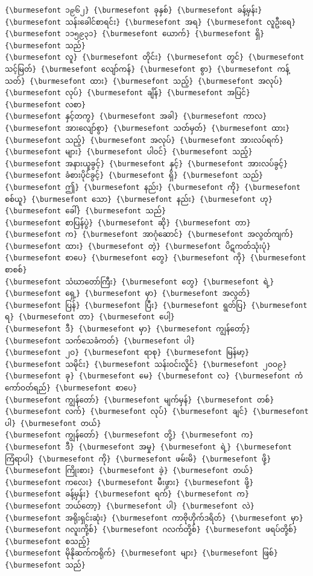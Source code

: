 \documentclass[11pt]{article}
\begin{document}
    \begin{Verbatim}[commandchars=\\\{\}]
{\burmesefont ၁၉၆၂} {\burmesefont ခုနှစ်} {\burmesefont ခန့်မှန်း} {\burmesefont သန်းခေါင်စာရင်း} {\burmesefont အရ} {\burmesefont လူဦးရေ} {\burmesefont ၁၁၅၉၃၁} {\burmesefont ယောက်} {\burmesefont ရှိ} {\burmesefont သည်}
{\burmesefont လူ} {\burmesefont တိုင်း} {\burmesefont တွင်} {\burmesefont သင့်မြတ်} {\burmesefont လျော်ကန်} {\burmesefont စွာ} {\burmesefont ကန့်သတ်} {\burmesefont ထား} {\burmesefont သည့်} {\burmesefont အလုပ်} {\burmesefont လုပ်} {\burmesefont ချိန်} {\burmesefont အပြင်} {\burmesefont လစာ}
{\burmesefont နှင့်တကွ} {\burmesefont အခါ} {\burmesefont ကာလ} {\burmesefont အားလျော်စွာ} {\burmesefont သတ်မှတ်} {\burmesefont ထား} {\burmesefont သည့်} {\burmesefont အလုပ်} {\burmesefont အားလပ်ရက်} {\burmesefont များ} {\burmesefont ပါဝင်} {\burmesefont သည့်}
{\burmesefont အနားယူခွင့်} {\burmesefont နှင့်} {\burmesefont အားလပ်ခွင့်} {\burmesefont ခံစားပိုင်ခွင့်} {\burmesefont ရှိ} {\burmesefont သည်}
{\burmesefont ဤ} {\burmesefont နည်း} {\burmesefont ကို} {\burmesefont စစ်ယူ} {\burmesefont သော} {\burmesefont နည်း} {\burmesefont ဟု} {\burmesefont ခေါ်} {\burmesefont သည်}
{\burmesefont စာပြန်ပွဲ} {\burmesefont ဆို} {\burmesefont တာ} {\burmesefont က} {\burmesefont အာဂုံဆောင်} {\burmesefont အလွတ်ကျက်} {\burmesefont ထား} {\burmesefont တဲ့} {\burmesefont ပိဋကတ်သုံးပုံ} {\burmesefont စာပေ} {\burmesefont တွေ} {\burmesefont ကို} {\burmesefont စာစစ်}
{\burmesefont သံဃာတော်ကြီး} {\burmesefont တွေ} {\burmesefont ရဲ့} {\burmesefont ရှေ့} {\burmesefont မှာ} {\burmesefont အလွတ်} {\burmesefont ပြန်} {\burmesefont ပြီး} {\burmesefont ရွတ်ပြ} {\burmesefont ရ} {\burmesefont တာ} {\burmesefont ပေါ့}
{\burmesefont ဒီ} {\burmesefont မှာ} {\burmesefont ကျွန်တော့်} {\burmesefont သက်သေခံကတ်} {\burmesefont ပါ}
{\burmesefont ၂ဝ} {\burmesefont ရာစု} {\burmesefont မြန်မာ့} {\burmesefont သမိုင်း} {\burmesefont သန်းဝင်းလှိုင်} {\burmesefont ၂ဝဝ၉} {\burmesefont ခု} {\burmesefont မေ} {\burmesefont လ} {\burmesefont ကံကော်ဝတ်ရည်} {\burmesefont စာပေ}
{\burmesefont ကျွန်တော်} {\burmesefont မျက်မှန်} {\burmesefont တစ်} {\burmesefont လက်} {\burmesefont လုပ်} {\burmesefont ချင်} {\burmesefont ပါ} {\burmesefont တယ်}
{\burmesefont ကျွန်တော်} {\burmesefont တို့} {\burmesefont က} {\burmesefont ဒီ} {\burmesefont အမှု} {\burmesefont ရဲ့} {\burmesefont ကြံရာပါ} {\burmesefont ကို} {\burmesefont ဖမ်းမိ} {\burmesefont ဖို့} {\burmesefont ကြိုးစား} {\burmesefont ခဲ့} {\burmesefont တယ်}
{\burmesefont ကလေး} {\burmesefont မီးဖွား} {\burmesefont ဖို့} {\burmesefont ခန့်မှန်း} {\burmesefont ရက်} {\burmesefont က} {\burmesefont ဘယ်တော့} {\burmesefont ပါ} {\burmesefont လဲ}
{\burmesefont အရိုးရှင်းဆုံး} {\burmesefont ကာဗိုဟိုက်ဒရိတ်} {\burmesefont မှာ} {\burmesefont ဂလူးကို့စ်} {\burmesefont ဂလက်တို့စ်} {\burmesefont ဖရပ်တို့စ်} {\burmesefont စသည့်}
{\burmesefont မိုနိုဆက်ကရိုက်} {\burmesefont များ} {\burmesefont ဖြစ်} {\burmesefont သည်}
    \end{Verbatim}
\end{document}
